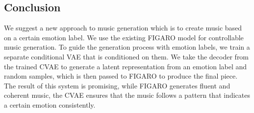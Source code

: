 \documentclass{article}
\begin{document}
\subsection{Conclusion}
We suggest a new approach to music generation which is to create music based on a certain emotion label. We use the existing FIGARO model for controllable music generation. To guide the generation process with emotion labels, we train a separate conditional VAE that is conditioned on them. We take the decoder from the trained CVAE to generate a latent representation from an emotion label and random samples, which is then passed to FIGARO to produce the final piece. The result of this system is promising, while FIGARO generates fluent and coherent music, the CVAE ensures that the music follows a pattern that indicates a certain emotion consistently.



 
\end{document}
